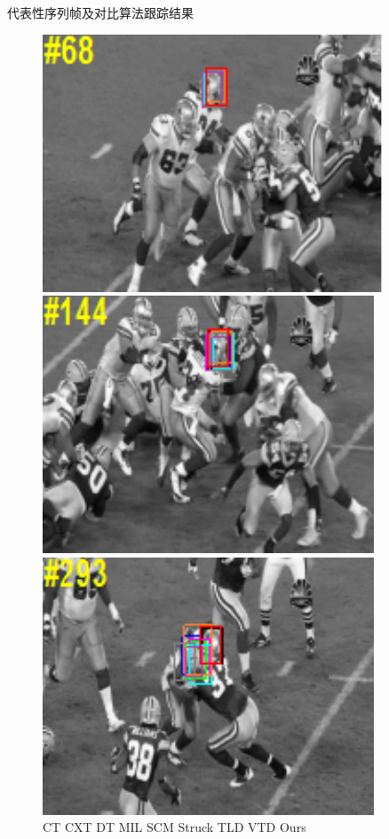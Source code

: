 \begin{frame}{代表性序列帧及对比算法跟踪结果}
\begin{figure}[htp]
\includegraphics[width=0.31\textheight,height=0.25\textheight]{figures/Figure2c1.pdf}
\includegraphics[width=0.31\textheight,height=0.25\textheight]{figures/Figure2c2.pdf}
\includegraphics[width=0.31\textheight,height=0.25\textheight]{figures/Figure2c3.pdf}\\

   CT
   CXT
   DT
   MIL
   SCM
   Struck
   TLD
   VTD
   Ours

\end{figure}

\end{frame}

